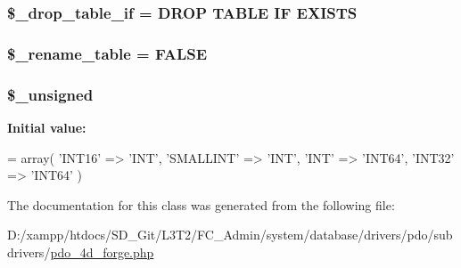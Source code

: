 \subsubsection[{\$\+\_\+drop\+\_\+table\+\_\+if}]{\setlength{\rightskip}{0pt plus 5cm}\$\+\_\+drop\+\_\+table\+\_\+if = \textquotesingle{}D\+R\+O\+P T\+A\+B\+L\+E I\+F E\+X\+I\+S\+T\+S\textquotesingle{}\hspace{0.3cm}{\ttfamily [protected]}}\label{class_c_i___d_b__pdo__4d__forge_a92a8a9145a7fc91e252e58d019373581}
\hypertarget{class_c_i___d_b__pdo__4d__forge_a1a649e7cf9de16bcf932977b18bc91de}{}
\subsubsection[{\$\+\_\+rename\+\_\+table}]{\setlength{\rightskip}{0pt plus 5cm}\$\+\_\+rename\+\_\+table = F\+A\+L\+S\+E\hspace{0.3cm}{\ttfamily [protected]}}\label{class_c_i___d_b__pdo__4d__forge_a1a649e7cf9de16bcf932977b18bc91de}
\hypertarget{class_c_i___d_b__pdo__4d__forge_aae977ae6d61fa183f0b25422b6ddc31c}{}
\subsubsection[{\$\+\_\+unsigned}]{\setlength{\rightskip}{0pt plus 5cm}\$\+\_\+unsigned\hspace{0.3cm}{\ttfamily [protected]}}\label{class_c_i___d_b__pdo__4d__forge_aae977ae6d61fa183f0b25422b6ddc31c}
{\bfseries Initial value\+:}
\begin{DoxyCode}
= array(
        \textcolor{stringliteral}{'INT16'}     => \textcolor{stringliteral}{'INT'},
        \textcolor{stringliteral}{'SMALLINT'}  => \textcolor{stringliteral}{'INT'},
        \textcolor{stringliteral}{'INT'}       => \textcolor{stringliteral}{'INT64'},
        \textcolor{stringliteral}{'INT32'}     => \textcolor{stringliteral}{'INT64'}
    )
\end{DoxyCode}


The documentation for this class was generated from the following file\+:\begin{DoxyCompactItemize}
\item 
D\+:/xampp/htdocs/\+S\+D\+\_\+\+Git/\+L3\+T2/\+F\+C\+\_\+\+Admin/system/database/drivers/pdo/subdrivers/\hyperlink{pdo__4d__forge_8php}{pdo\+\_\+4d\+\_\+forge.\+php}\end{DoxyCompactItemize}
